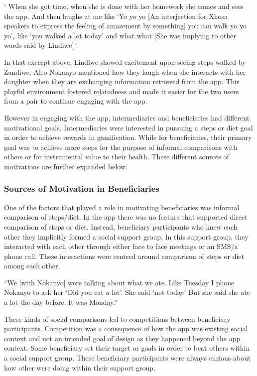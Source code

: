  {` When she got time, when she is done with her homework she comes and sees the app. And then laughs at me like `Yo yo yo [An interjection for Xhosa speakers to express the feeling of amazement by something] you can walk yo yo yo', like `you walked a lot today' and what what [She was implying to other words said by Lindiwe]''}

In that excerpt above, Lindiwe showed excitement upon seeing steps walked by Zandiwe. Also Nokanyo mentioned how they laugh when she interacts with her daughter when they are exchanging information retrieved from the app. This playful environment fostered relatedness and made it easier for the two users from a pair to continue engaging with the app. 

However in engaging with the app, intermediaries and beneficiaries had different motivational goals. Intermediaries were interested in pursuing a steps or diet goal in order to achieve rewards in gamification. While for beneficiaries, their primary goal was to achieve more steps for the purpose of informal comparisons with others or for instrumental value to their health. These different sources of motivations are further expanded below.
\subsubsection{Sources of Motivation in Beneficiaries}
One of the factors that played a role in motivating beneficiaries was informal comparison of steps/diet. In the app there was no feature that supported direct comparison of steps or diet. Instead, beneficiary participants who knew each other they implicitly formed a social support group. In this support group, they interacted with each other through either face to face meetings or an SMS/a phone call. These interactions were centred around comparison of steps or diet among each other. 

 {``We [with Nokanyo] were talking about what we ate. Like Tuesday I phone Nokanyo to ask her `Did you eat a lot'. She said `not today' But she said she ate a lot the day before. It was Monday.''}

These kinds of social comparisons led to competitions between beneficiary participants. Competition was a  consequence of how the app was existing social context and not an intended goal of design as they happened beyond the app context.  Some beneficiary set their target or goals in order to beat others within a social support group. These beneficiary participants were always curious about how other were doing within their support group.
 
